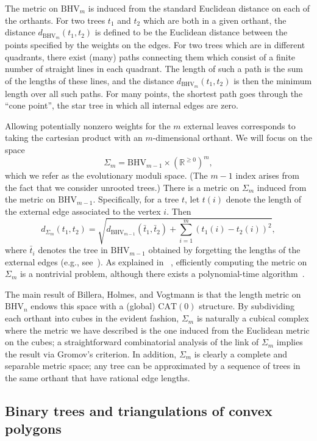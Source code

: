 \documentclass[a4paper,11pt]{article}
\newcommand{\CAT}{\textrm{CAT}}
\newcommand{\BHV}{\textrm{BHV}}
\begin{document}
The metric on $\BHV_{m}$ is induced from the standard Euclidean
distance on each of the orthants.  For two trees $t_1$ and $t_2$ which
are both in a given orthant, the distance $d_{\BHV_{m}}(t_1,t_2)$ is
defined to be the Euclidean distance between the points specified by
the weights on the edges.  For two trees which are in different
quadrants, there exist (many) paths connecting them which consist of a
finite number of straight lines in each quadrant.  The length of such
a path is the sum of the lengths of these lines, and the distance
$d_{\BHV_{m}}(t_1,t_2)$ is then the minimum length over all such
paths.  For many points, the shortest path goes through the ``cone
point'', the star tree in which all internal edges are zero.

Allowing potentially nonzero weights for the $m$ external leaves
corresponds to taking the cartesian product with an $m$-dimensional
orthant.  We will focus on the space
\[\Sigma_m = \BHV_{m-1} \times (\mathbb{R}^{\geq 0})^{m},\]
which we refer as the evolutionary moduli space.  (The $m-1$ index
arises from the fact that we consider unrooted trees.)  There is a
metric on $\Sigma_m$ induced from the metric on $\BHV_{m-1}$.
Specifically, for a tree $t$, let $t(i)$ denote the length of the
external edge associated to the vertex $i$.
Then \[d_{\Sigma_m}(t_1,t_2) =
\sqrt{d_{\BHV_{m-1}}(\bar{t}_1,\bar{t}_2) + \sum_{i=1}^m (t_1(i) -
  t_2(i))^2},\] where $\bar{t}_i$ denotes the tree in $\BHV_{m-1}$
obtained by forgetting the lengths of the external edges (e.g.,
see~\cite{owen2011fast}).
As explained in ~\cite[\S4.2]{billera2001geometry}, efficiently
computing the metric on $\Sigma_m$ is a nontrivial problem, although
there exists a polynomial-time algorithm~\cite{owen2011fast}.

The main result of Billera, Holmes, and Vogtmann is that the length
metric on $\BHV_n$ endows this space with a (global) $\CAT(0)$
structure.  By subdividing each orthant into cubes in the evident
fashion, $\Sigma_m$ is naturally a cubical complex where the metric we
have described is the one induced from the Euclidean metric on the
cubes; a straightforward combinatorial analysis of the link of
$\Sigma_m$ implies the result via Gromov's criterion.
In addition, $\Sigma_m$ is clearly a complete and separable metric
space; any tree can be approximated by a sequence of trees in the same
orthant that have rational edge lengths.

\subsection{Binary trees and triangulations of convex polygons}
\end{document}
